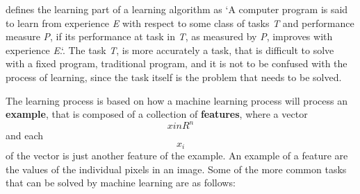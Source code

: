\documentclass{article}
\begin{document}
\cite{mitchel97} defines the learning part of a learning algorithm as `A computer program is said to learn from experience \textit{E} with respect to some class of tasks \textit{T} and performance measure \textit{P}, if its performance at task in \textit{T}, as measured by \textit{P}, improves with experience \textit{E}.`. The task \textit{T}, is more accurately a task, that is difficult to solve with a fixed program, traditional program, and it is not to be confused with the process of learning, since the task itself is the problem that needs to be solved.

The learning process is based on how a machine learning process will process an \textbf{example}, that is composed of a collection of \textbf{features}, where a vector \[x in R^n \] and each \[x_i\] of the vector is just another feature of the example. An example of a feature are the values of the individual pixels in an image. Some of the more common tasks that can be solved by machine learning are as follows:
\end{document}
